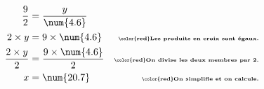 \begin{corrige}
\begin{enumerate}
        \begin{align*}
            \dfrac{9}{2}        &=\dfrac{y}{\num{4.6}}           &\\
            2\times y           &= 9\times\num{4.6}             &\text{\bfseries\tiny\color{red}Les produits en croix sont égaux.}\\
            \dfrac{2\times y}{2}&= \dfrac{9\times\num{4.6}}{2}  &\text{\bfseries\tiny\color{red}On divise les deux membres par 2.}\\
            x                   &=\num{20.7}              &\text{\bfseries\tiny\color{red}On simplifie et on calcule.}
        \end{align*}
    \end{enumerate}
\end{corrige}

